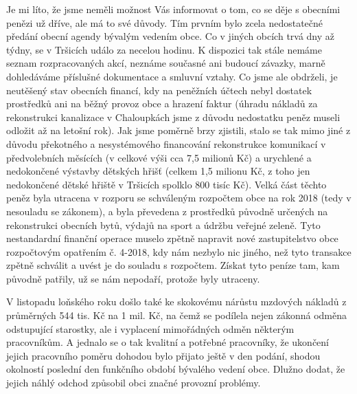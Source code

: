 \documentclass[11pt]{article}
\begin{document}
\begin{multicols}{2}
{Je mi líto, že jsme neměli možnost Vás informovat o tom, co se děje s obecními penězi už dříve, ale má to své důvody. Tím prvním bylo zcela nedostatečné předání obecní agendy bývalým vedením obce. Co v jiných obcích trvá dny až týdny, se v Tršicích událo za necelou hodinu. K dispozici tak stále nemáme seznam rozpracovaných akcí, neznáme současné ani budoucí závazky, marně dohledáváme příslušné dokumentace a smluvní vztahy. Co jsme ale obdrželi, je neutěšený stav obecních financí, kdy na peněžních účtech nebyl dostatek prostředků ani na běžný provoz obce a hrazení faktur (úhradu nákladů za rekonstrukci kanalizace v Chaloupkách jsme z důvodu nedostatku peněz museli odložit až na letošní rok). Jak jsme poměrně brzy zjistili, stalo se tak mimo jiné z důvodu překotného a nesystémového financování rekonstrukce komunikací v předvolebních měsících (v celkové výši cca 7,5 milionů Kč) a urychlené a nedokončené výstavby dětských hřišť (celkem 1,5 milionu Kč, z toho jen nedokončené dětské hřiště v Tršicích spolklo 800 tisíc Kč). Velká část těchto peněz byla utracena v rozporu se schváleným rozpočtem obce na rok 2018 (tedy v nesouladu se zákonem), a byla převedena z prostředků původně určených na rekonstrukci obecních bytů, výdajů na sport a údržbu veřejné zeleně. Tyto nestandardní finanční operace muselo zpětně napravit nové zastupitelstvo obce rozpočtovým opatřením č. 4-2018, kdy nám nezbylo nic jiného, než tyto transakce zpětně schválit a uvést je do souladu s rozpočtem. Získat tyto peníze tam, kam původně patřily, už se nám nepodaří, protože byly utraceny.

V listopadu loňského roku došlo také ke skokovému nárůstu mzdových nákladů z průměrných 544 tis. Kč na 1 mil. Kč, na čemž se podílela nejen zákonná odměna odstupující starostky, ale i vyplacení mimořádných odměn některým pracovníkům. A jednalo se o tak kvalitní a potřebné pracovníky, že ukončení jejich pracovního poměru dohodou bylo přijato ještě v den podání, shodou okolností poslední den funkčního období bývalého vedení obce. Dlužno dodat, že jejich náhlý odchod způsobil obci značné provozní problémy.

}
\end{multicols}
\end{document}
